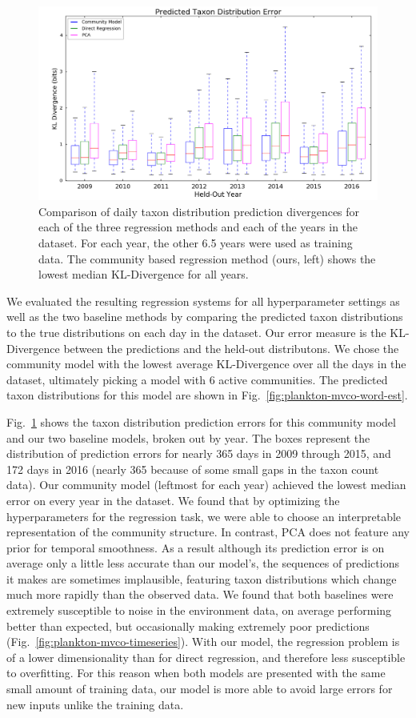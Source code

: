 \begin{figure}
    \centering
    \includegraphics[width=0.8\linewidth]{figures/oceans/KLDivergenceBoxplot-C.png}
    \caption{Comparison of daily taxon distribution prediction divergences for each of the three regression methods and each of the years in the dataset. For each year, the other 6.5 years were used as training data. The community based regression method (ours, left) shows the lowest median KL-Divergence for all years.}
    \label{fig:plankton-mvco-kl-boxplot}
\end{figure}

We evaluated the resulting regression systems for all hyperparameter settings as well as the two baseline methods by comparing the predicted taxon distributions to the true distributions on each day in the dataset. Our error measure is the KL-Divergence between the predictions and the held-out distributons. We chose the community model with the lowest average KL-Divergence over all the days in the dataset, ultimately picking a model with 6 active communities. The predicted taxon distributions for this model are shown in Fig.~\ref{fig:plankton-mvco-word-est}.

Fig.~\ref{fig:plankton-mvco-kl-boxplot} shows the taxon distribution prediction errors for this community model and our two baseline models, broken out by year. The boxes represent the distribution of prediction errors for nearly 365 days in 2009 through 2015, and 172 days in 2016 (nearly 365 because of some small gaps in the taxon count data). Our community model (leftmost for each year) achieved the lowest median error on every year in the dataset. We found that by optimizing the hyperparameters for the regression task, we were able to choose an interpretable representation of the community structure. In contrast, PCA does not feature any prior for temporal smoothness. As a result although its prediction error is on average only a little less accurate than our model's, the sequences of predictions it makes are sometimes implausible, featuring taxon distributions which change much more rapidly than the observed data. We found that both baselines were extremely susceptible to noise in the environment data, on average performing better than expected, but occasionally making extremely poor predictions (Fig.~\ref{fig:plankton-mvco-timeseries}). With our model, the regression problem is of a lower dimensionality than for direct regression, and therefore less susceptible to overfitting. For this reason when both models are presented with the same small amount of training data, our model is more able to avoid large errors for new inputs unlike the training data.

